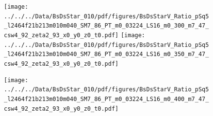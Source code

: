 \documentclass[a4paper,10pt]{article}
\begin{document}
\clearpage
\begin{figure}[p]
 \texttt{[image: ../../../Data/BsDsStar\_010/pdf/figures/BsDsStarV\_Ratio\_pSq5\_l2464f21b213m010m040\_SM7\_86\_PT\_m0\_03224\_LS16\_m0\_300\_m7\_47\_csw4\_92\_zeta2\_93\_x0\_y0\_z0\_t0.pdf]} 
 \texttt{[image: ../../../Data/BsDsStar\_010/pdf/figures/BsDsStarV\_Ratio\_pSq5\_l2464f21b213m010m040\_SM7\_86\_PT\_m0\_03224\_LS16\_m0\_350\_m7\_47\_csw4\_92\_zeta2\_93\_x0\_y0\_z0\_t0.pdf]} 
 \end{figure}
\begin{figure}[p]
 \texttt{[image: ../../../Data/BsDsStar\_010/pdf/figures/BsDsStarV\_Ratio\_pSq5\_l2464f21b213m010m040\_SM7\_86\_PT\_m0\_03224\_LS16\_m0\_400\_m7\_47\_csw4\_92\_zeta2\_93\_x0\_y0\_z0\_t0.pdf]} 
 \end{figure}
\clearpage
\end{document}
